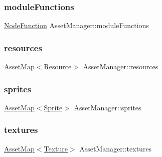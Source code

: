 \mbox{\label{class_asset_manager_ace1c7d5843177a2b49f4fd2afa903309}} 
\subsubsection{\texorpdfstring{module\+Functions}{moduleFunctions}}
{\footnotesize\ttfamily \hyperlink{class_asset_manager_a681158dc461420e008e0f88312bf10e9}{Node\+Function} Asset\+Manager\+::module\+Functions\hspace{0.3cm}{\ttfamily [private]}}

\mbox{\label{class_asset_manager_ac071054fd72641e5f66c85c757b45516}} 
\subsubsection{\texorpdfstring{resources}{resources}}
{\footnotesize\ttfamily \hyperlink{class_asset_manager_a67ef2a74c058b6cebefd838bcc3a7d96}{Asset\+Map}$<$\hyperlink{class_resource}{Resource}$>$ Asset\+Manager\+::resources\hspace{0.3cm}{\ttfamily [private]}}

\mbox{\label{class_asset_manager_a2b51544270fd1aa09654fe3241241c63}} 
\subsubsection{\texorpdfstring{sprites}{sprites}}
{\footnotesize\ttfamily \hyperlink{class_asset_manager_a67ef2a74c058b6cebefd838bcc3a7d96}{Asset\+Map}$<$\hyperlink{class_sprite}{Sprite}$>$ Asset\+Manager\+::sprites\hspace{0.3cm}{\ttfamily [private]}}

\mbox{\label{class_asset_manager_ab8a68f50bb34f1daee3ea563c0ba31e7}} 
\subsubsection{\texorpdfstring{textures}{textures}}
{\footnotesize\ttfamily \hyperlink{class_asset_manager_a67ef2a74c058b6cebefd838bcc3a7d96}{Asset\+Map}$<$\hyperlink{class_texture}{Texture}$>$ Asset\+Manager\+::textures\hspace{0.3cm}{\ttfamily [private]}}

